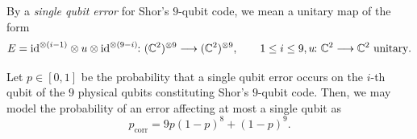 \documentclass[a4paper, oneside, 12pt]{amsart}
\begin{document}
\begin{convention}
  By a \emph{single qubit error} for Shor's \(9\)-qubit code, we mean a unitary map of the form
  \begin{equation*}
    E = \id^{\otimes (i-1)}\otimes u \otimes \id^{\otimes (9-i)} \from ( \mathbb{C}^{2})^{ \otimes 9} \to ( \mathbb{C}^{2})^{ \otimes 9}, \qquad 1\leq i\leq 9, u \from \mathbb{C}^{2} \to \mathbb{C}^{2} \text{ unitary}.
  \end{equation*}
\end{convention}
Let \(p\in [0,1]\) be the probability that a single qubit error occurs on the \(i\)-th qubit of the \(9\) physical qubits constituting Shor's \(9\)-qubit code.
Then, we may model the probability of an error affecting at most a single qubit as
\begin{equation*}
  p_{\mathrm{corr}} = 9p(1-p)^{8} + (1-p)^{9}.
\end{equation*}
\end{document}
